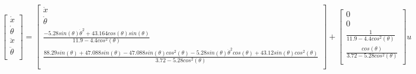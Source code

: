 \documentclass[a4paper,11pt]{article}
\theoremstyle{mytheor}
\begin{document}
\[
\begin{bmatrix}
\dot{x}\\
\dot{\theta}\\
\ddot{x}\\
\ddot{\theta}\\
\end{bmatrix}
=
\begin{bmatrix}
\dot{x}\\
\dot{\theta}\\
\frac{-5.28sin(\theta)\dot{\theta}^{2}+43.164cos(\theta)sin(\theta)}{11.9-4.4cos^{2}(\theta)}\\
\frac{88.29sin(\theta)+47.088sin(\theta)-47.088sin(\theta)cos^{2}(\theta)-5.28sin(\theta)\dot{\theta}^{2}cos(\theta)+43.12sin(\theta)cos^{2}(\theta)}{3.72-5.28cos^{2}(\theta)}\\
\end{bmatrix}
+
\begin{bmatrix}
0\\
0\\
\frac{1}{11.9-4.4cos^{2}(\theta)}\\
\frac{cos(\theta)}{3.72-5.28cos^{2}(\theta)}\\
\end{bmatrix}
u
\]
\end{document}
